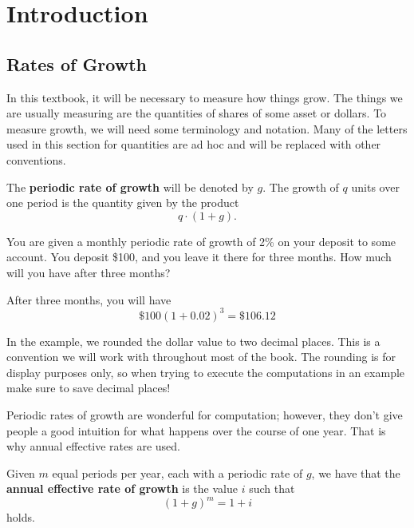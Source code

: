 \documentclass{ximera}
\begin{document}
\chapter{Introduction}

\section{Rates of Growth}

In this textbook, it will be necessary to measure how things grow. The things we are usually measuring are the quantities of shares of some asset or dollars. To measure growth, we will need some terminology and notation. Many of the letters used in this section for quantities are ad hoc and will be replaced with other conventions. 

\begin{definition}
The {\bf periodic rate of growth} will be denoted by $g$. The growth of $q$ units over one period is the quantity given by the product
	\begin{equation*}
		q\cdot(1+g).
	\end{equation*}
\end{definition}

\begin{example}
You are given a monthly periodic rate of growth of 2\% on your deposit to some account. You deposit \$100, and you leave it there for three months. How much will you have after three months? 
\end{example}

\begin{solution}
After three months, you will have
	\begin{equation*}
		\$100(1+0.02)^3=\$106.12
	\end{equation*}
\end{solution}

In the example, we rounded the dollar value to two decimal places. This is a convention we will work with throughout most of the book. The rounding is for display purposes only, so when trying to execute the computations in an example make sure to save decimal places!

Periodic rates of growth are wonderful for computation; however, they don't give people a good intuition for what happens over the course of one year. That is why annual effective rates are used.

\begin{definition}
Given $m$ equal periods per year, each with a periodic rate of $g$, we have that the {\bf annual effective rate of growth} is the value $i$ such that
	\begin{equation*}
		(1+g)^m=1+i
	\end{equation*}
holds.
\end{definition}
\end{document}
